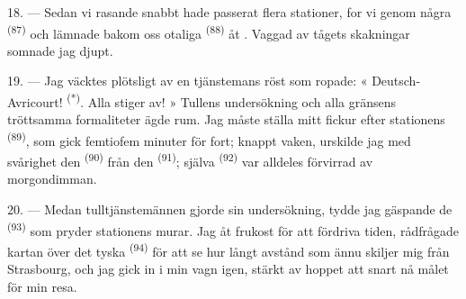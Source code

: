 18. --- Sedan vi rasande snabbt hade passerat flera stationer, for vi genom några
 \textsuperscript{(87)} och lämnade bakom oss otaliga
 \textsuperscript{(88)} åt . Vaggad av tågets
skakningar somnade jag djupt.

\VUsaut{3.0mm}
\VUsaut{3.0mm}

19. --- Jag väcktes plötsligt av en tjänstemans röst som ropade: « Deutsch-Avricourt!
\textsuperscript{(*)}. Alla stiger av! » Tullens undersökning och alla gränsens tröttsamma
formaliteter ägde rum. Jag måste ställa mitt fickur efter stationens 
\textsuperscript{(89)}, som gick femtiofem minuter för fort; knappt vaken, urskilde jag med
svårighet den
 \textsuperscript{(90)} från den 
\textsuperscript{(91)}; själva  \textsuperscript{(92)} var alldeles förvirrad
av morgondimman.

20. --- Medan tulltjänstemännen gjorde sin undersökning, tydde jag gäspande de
 \textsuperscript{(93)} som pryder stationens murar. Jag åt
frukost för att fördriva tiden, rådfrågade kartan över det tyska 
\textsuperscript{(94)} för att se hur långt avstånd som ännu skiljer mig från Strasbourg, och
jag gick in i min vagn igen, stärkt av hoppet att snart nå målet för min resa.
\VUsaut{6.0mm}
\VUfilet{22mm}

